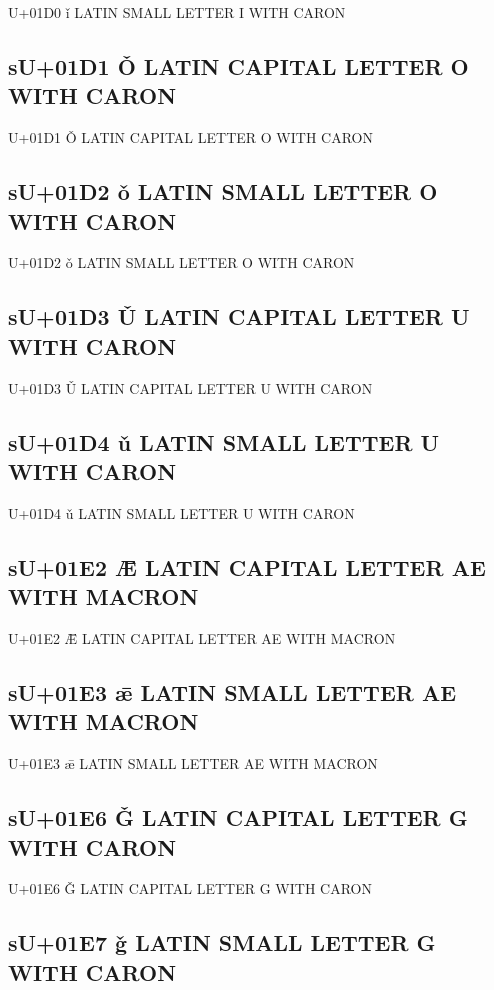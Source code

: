 U+01D0 ǐ  LATIN SMALL LETTER I WITH CARON

\subsection{sU+01D1 Ǒ  LATIN CAPITAL LETTER O WITH CARON}

U+01D1 Ǒ  LATIN CAPITAL LETTER O WITH CARON

\subsection{sU+01D2 ǒ  LATIN SMALL LETTER O WITH CARON}

U+01D2 ǒ  LATIN SMALL LETTER O WITH CARON

\subsection{sU+01D3 Ǔ  LATIN CAPITAL LETTER U WITH CARON}

U+01D3 Ǔ  LATIN CAPITAL LETTER U WITH CARON

\subsection{sU+01D4 ǔ  LATIN SMALL LETTER U WITH CARON}

U+01D4 ǔ  LATIN SMALL LETTER U WITH CARON

\subsection{sU+01E2 Ǣ  LATIN CAPITAL LETTER AE WITH MACRON}

U+01E2 Ǣ  LATIN CAPITAL LETTER AE WITH MACRON

\subsection{sU+01E3 ǣ  LATIN SMALL LETTER AE WITH MACRON}

U+01E3 ǣ  LATIN SMALL LETTER AE WITH MACRON

\subsection{sU+01E6 Ǧ  LATIN CAPITAL LETTER G WITH CARON}

U+01E6 Ǧ  LATIN CAPITAL LETTER G WITH CARON

\subsection{sU+01E7 ǧ  LATIN SMALL LETTER G WITH CARON}

